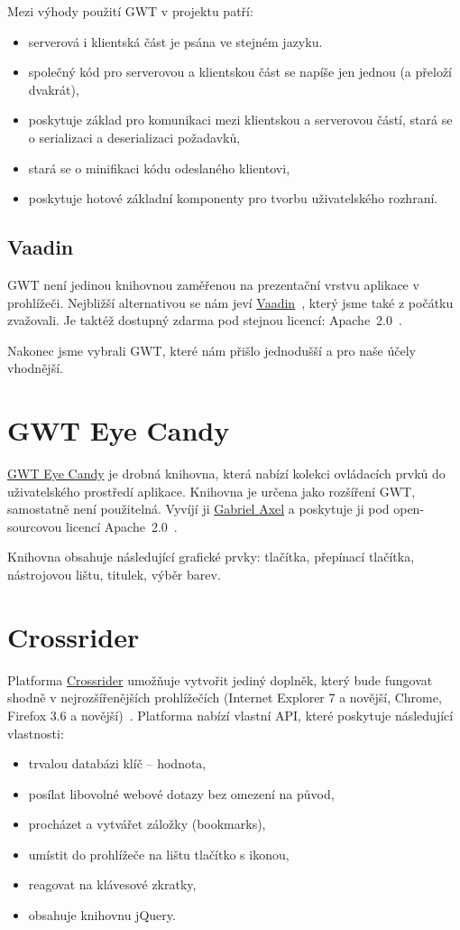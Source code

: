 Mezi výhody použití GWT v projektu patří:
\begin{itemize}
    \item serverová i klientská část je psána ve stejném jazyku.
    \item společný kód pro serverovou a klientskou část se napíše jen jednou (a přeloží dvakrát),
    \item poskytuje základ pro komunikaci mezi klientskou a serverovou částí, stará se o serializaci a deserializaci požadavků,
    \item stará se o minifikaci kódu odeslaného klientovi,
    \item poskytuje hotové základní komponenty pro tvorbu uživatelského rozhraní.
\end{itemize}

\subsection{Vaadin}
GWT není jedinou knihovnou zaměřenou na prezentační vrstvu aplikace v prohlížeči.
Nejbližší alternativou se nám jeví \href{https://vaadin.com/home}{Vaadin}~\cite{Vaadin}, který jsme také z počátku zvažovali.
Je taktéž dostupný zdarma pod stejnou licencí: Apache~2.0~\cite{apache20}.

Nakonec jsme vybrali GWT, které nám přišlo jednodušší a pro naše účely vhodnější.

\section{GWT Eye Candy}
\href{http://code.google.com/p/gwt-eye-candy/}{GWT Eye Candy} je drobná knihovna, která nabízí kolekci ovládacích prvků do uživatelského prostředí aplikace.
Knihovna je určena jako rozšíření GWT, samostatně není použitelná.
Vyvíjí ji \href{mailto:guznik@gmail.com}{Gabriel Axel} a poskytuje ji pod open-sourcovou licencí Apache~2.0~\cite{apache20}.

Knihovna obsahuje následující grafické prvky: tlačítka, přepínací tlačítka, nástrojovou lištu, titulek, výběr barev.

\section{Crossrider}
Platforma \href{http://crossrider.com/}{Crossrider} umožňuje vytvořit jediný doplněk, který bude fungovat shodně v nejrozšířenějších prohlížečích (Internet Explorer 7 a novější, Chrome, Firefox 3.6 a novější)~\cite{crossrider-faq}.
Platforma nabízí vlastní API, které poskytuje následující vlastnosti:
\begin{itemize}
	\item trvalou databázi klíč -- hodnota,
	\item posílat libovolné webové dotazy bez omezení na původ,
	\item procházet a vytvářet záložky (bookmarks),
	\item umístit do prohlížeče na lištu tlačítko s ikonou,
	\item reagovat na klávesové zkratky,
	\item obsahuje knihovnu jQuery.
\end{itemize}

